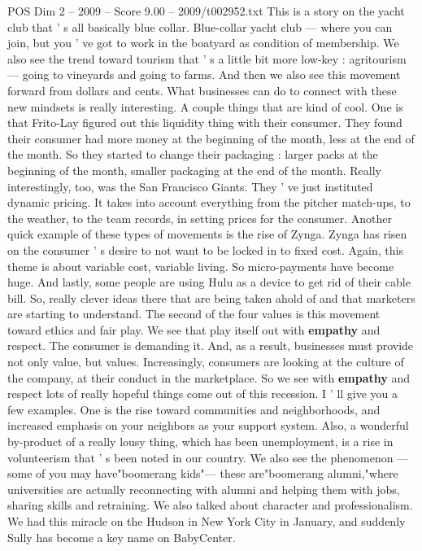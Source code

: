 \begin{textsample}{POS Dim 2 – 2009 – Score 9.00 – 2009/t002952.txt}
This is a story on the yacht club that ' s all basically blue collar.
Blue-collar yacht club — where you can join, but you ' ve got to work in the boatyard as condition of membership.
We also see the trend toward tourism that ' s a little bit more low-key : agritourism — going to vineyards and going to farms.
And then we also see this movement forward from dollars and cents.
What businesses can do to connect with these new mindsets is really interesting.
A couple things that are kind of cool.
One is that Frito-Lay figured out this liquidity thing with their consumer.
They found their consumer had more money at the beginning of the month, less at the end of the month.
So they started to change their packaging : larger packs at the beginning of the month, smaller packaging at the end of the month.
Really interestingly, too, was the San Francisco Giants.
They ' ve just instituted dynamic pricing.
It takes into account everything from the pitcher match-ups, to the weather, to the team records, in setting prices for the consumer.
Another quick example of these types of movements is the rise of Zynga.
Zynga has risen on the consumer ' s desire to not want to be locked in to fixed cost.
Again, this theme is about variable cost, variable living.
So micro-payments have become huge.
And lastly, some people are using Hulu as a device to get rid of their cable bill.
So, really clever ideas there that are being taken ahold of and that marketers are starting to understand.
The second of the four values is this movement toward ethics and fair play.
We see that play itself out with \textbf{empathy} and respect.
The consumer is demanding it.
And, as a result, businesses must provide not only value, but values.
Increasingly, consumers are looking at the culture of the company, at their conduct in the marketplace.
So we see with \textbf{empathy} and respect lots of really hopeful things come out of this recession.
I ' ll give you a few examples.
One is the rise toward communities and neighborhoods, and increased emphasis on your neighbors as your support system.
Also, a wonderful by-product of a really lousy thing, which has been unemployment, is a rise in volunteerism that ' s been noted in our country.
We also see the phenomenon — some of you may have"boomerang kids"— these are"boomerang alumni,"where universities are actually reconnecting with alumni and helping them with jobs, sharing skills and retraining.
We also talked about character and professionalism.
We had this miracle on the Hudson in New York City in January, and suddenly Sully has become a key name on BabyCenter.

\end{textsample}

